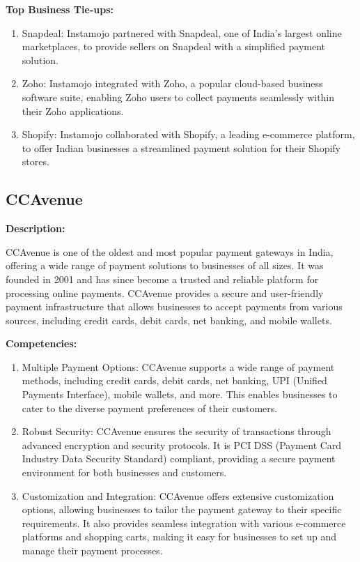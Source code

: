 \textbf{Top Business Tie-ups:}
\begin{enumerate}
    \item Snapdeal: Instamojo partnered with Snapdeal, one of India's largest online marketplaces, to provide sellers on Snapdeal with a simplified payment solution.
    \item Zoho: Instamojo integrated with Zoho, a popular cloud-based business software suite, enabling Zoho users to collect payments seamlessly within their Zoho applications.
    \item Shopify: Instamojo collaborated with Shopify, a leading e-commerce platform, to offer Indian businesses a streamlined payment solution for their Shopify stores.
\end{enumerate}
\subsection{CCAvenue}
\textbf{Description:}

CCAvenue is one of the oldest and most popular payment gateways in India, offering a wide range of payment solutions to businesses of all sizes. It was founded in 2001 and has since become a trusted and reliable platform for processing online payments. CCAvenue provides a secure and user-friendly payment infrastructure that allows businesses to accept payments from various sources, including credit cards, debit cards, net banking, and mobile wallets.

\textbf{Competencies:}

\begin{enumerate}
  \item Multiple Payment Options: CCAvenue supports a wide range of payment methods, including credit cards, debit cards, net banking, UPI (Unified Payments Interface), mobile wallets, and more. This enables businesses to cater to the diverse payment preferences of their customers.

  \item Robust Security: CCAvenue ensures the security of transactions through advanced encryption and security protocols. It is PCI DSS (Payment Card Industry Data Security Standard) compliant, providing a secure payment environment for both businesses and customers.

  \item Customization and Integration: CCAvenue offers extensive customization options, allowing businesses to tailor the payment gateway to their specific requirements. It also provides seamless integration with various e-commerce platforms and shopping carts, making it easy for businesses to set up and manage their payment processes.
\end{enumerate}

